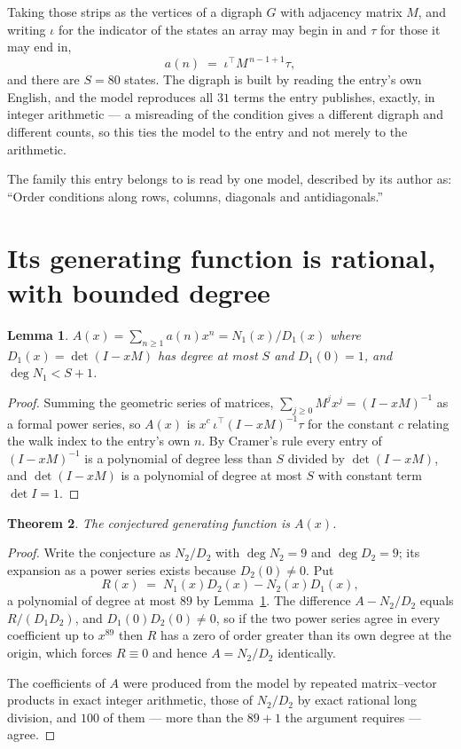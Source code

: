 \documentclass[11pt,a4paper]{article}
\theoremstyle{plain}
\newtheorem{theorem}{Theorem}
\newtheorem{lemma}[theorem]{Lemma}
\theoremstyle{definition}
\begin{document}
Taking those strips as the vertices of a digraph $G$ with adjacency matrix $M$, and writing
$\iota$ for the indicator of the states an array may begin in and $\tau$ for those it may end
in,
\[
a(n)\;=\;\iota^{\!\top}M^{\,n-1+1}\tau ,
\]
and there are $S=80$ states. The digraph is built by reading the entry's own English, and the
model reproduces all $31$ terms the entry publishes, exactly, in integer arithmetic --- a
misreading of the condition gives a different digraph and different counts, so this ties the
model to the entry and not merely to the arithmetic.

The family this entry belongs to is read by one model, described by its author as: ``Order conditions along rows, columns, diagonals and antidiagonals.''


\section{Its generating function is rational, with bounded degree}

\begin{lemma}\label{lem:rat}
$A(x)=\sum_{n\ge1}a(n)x^n=N_1(x)/D_1(x)$ where $D_1(x)=\det(I-xM)$ has degree at most
$S$ and $D_1(0)=1$, and $\deg N_1<S+1$.
\end{lemma}

\begin{proof}
Summing the geometric series of matrices, $\sum_{j\ge0}M^jx^j=(I-xM)^{-1}$ as a formal
power series, so $A(x)$ is $x^{c}\,\iota^{\!\top}(I-xM)^{-1}\tau$ for the constant $c$
relating the walk index to the entry's own $n$. By Cramer's rule every entry of
$(I-xM)^{-1}$ is a polynomial of degree less than $S$ divided by $\det(I-xM)$, and
$\det(I-xM)$ is a polynomial of degree at most $S$ with constant term $\det I=1$.
\end{proof}

\begin{theorem}
The conjectured generating function is $A(x)$.
\end{theorem}

\begin{proof}
Write the conjecture as $N_2/D_2$ with $\deg N_2=9$ and $\deg D_2=9$; its expansion as a
power series exists because $D_2(0)\neq0$. Put
\[
R(x)\;=\;N_1(x)D_2(x)-N_2(x)D_1(x),
\]
a polynomial of degree at most $89$ by Lemma~\ref{lem:rat}. The difference
$A-N_2/D_2$ equals $R/(D_1D_2)$, and $D_1(0)D_2(0)\neq0$, so if the two power series agree in
every coefficient up to $x^{89}$ then $R$ has a zero of order greater than its own
degree at the origin, which forces $R\equiv0$ and hence $A=N_2/D_2$ identically.

The coefficients of $A$ were produced from the model by repeated matrix--vector products in
exact integer arithmetic, those of $N_2/D_2$ by exact rational long division, and $100$
of them --- more than the $89+1$ the argument requires --- agree.
\end{proof}
\end{document}
